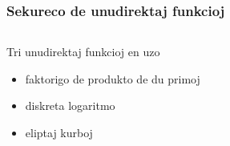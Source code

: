 \documentclass[utf8, aspectratio=169]{beamer}
\begin{document}
\begin{frame}
  \frametitle{Sekureco de unudirektaj funkcioj}
  \begin{columns}
    \begin{column}{0.5\textwidth}
      Tri unudirektaj funkcioj en uzo
      \begin{itemize}
      \item faktorigo de produkto de du primoj
      \item diskreta logaritmo
      \item eliptaj kurboj
      \end{itemize}
    \end{column}
    \begin{column}{0.5\textwidth}

    \end{column}
  \end{columns}
\end{frame}
\end{document}
